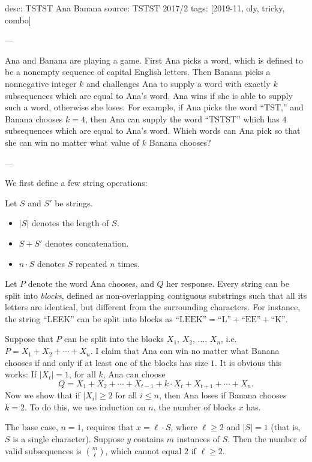 desc: TSTST Ana Banana
source: TSTST 2017/2
tags: [2019-11, oly, tricky, combo]

---

Ana and Banana are playing a game. First Ana picks a word, which is defined to be a nonempty sequence of capital English letters. Then Banana picks a nonnegative integer $k$ and challenges Ana to supply a word with exactly $k$ subsequences which are equal to Ana's word. Ana wins if she is able to supply such a word, otherwise she loses. For example, if Ana picks the word ``TST,'' and Banana chooses $k=4$, then Ana can supply the word ``TSTST'' which has $4$ subsequences which are equal to Ana's word. Which words can Ana pick so that she can win no matter what value of $k$ Banana chooses?

---

We first define a few string operations:
\begin{definition*}
    Let $S$ and $S'$ be strings.
    \begin{itemize}[itemsep=0em]
        \item $|S|$ denotes the length of $S$.
        \item $S+S'$ denotes concatenation.
        \item $n\cdot S$ denotes $S$ repeated $n$ times.
    \end{itemize}
\end{definition*}
Let $P$ denote the word Ana chooses, and $Q$ her response. Every string can be split into \textit{blocks}, defined as non-overlapping contiguous substrings such that all its letters are identical, but different from the surrounding characters. For instance, the string ``LEEK'' can be split into blocks as $\text{``LEEK''}=\text{``L''}+\text{``EE''}+\text{``K''}$.

Suppose that $P$ can be split into the blocks $X_1,\,X_2,\,\ldots,\,X_n$, i.e. $P=X_1+X_2+\cdots+X_n$. I claim that Ana can win no matter what Banana chooses if and only if at least one of the blocks has size $1$. It is obvious this works: If $|X_t|=1$, for all $k$, Ana can choose \[Q=X_1+X_2+\cdots+X_{t-1}+k\cdot X_t+X_{t+1}+\cdots+X_n.\]
Now we show that if $|X_i|\ge2$ for all $i\le n$, then Ana loses if Banana chooses $k=2$. To do this, we use induction on $n$, the number of blocks $x$ has.

The base case, $n=1$, requires that $x=\ell\cdot S$, where $\ell\ge2$ and $|S|=1$ (that is, $S$ is a single character). Suppose $y$ contains $m$ instances of $S$. Then the number of valid subsequences is $\binom m\ell$, which cannot equal $2$ if $\ell\ge2$.

